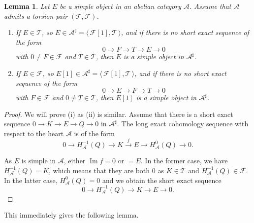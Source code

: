 \documentclass[12pt]{amsart}
\newtheorem{lemma}[theorem]{Lemma}
\theoremstyle{definition}
\DeclareMathOperator{\Img}{Im}
\begin{document}
\begin{lemma}\label{tiltsimple}
Let $E$ be a simple object in an abelian category $\mathcal{A}$.  
Assume that $\mathcal{A}$ admits a torsion pair $(\mathcal{T},\mathcal{F})$.
\begin{enumerate}
\item If $E \in \mathcal{T}$, so $E \in \mathcal{A}^\sharp = \langle \, \mathcal{F}[1], \mathcal{T} \,\rangle$,
and if there is no short exact sequence of the form $$ 0 \longrightarrow F \longrightarrow T \longrightarrow E \longrightarrow 0$$
with $0 \neq F \in \mathcal{F}$ and $T \in \mathcal{T}$,
then $E$ is a simple object in $\mathcal{A}^\sharp$.
\item If $E \in \mathcal{F}$, so $E[1] \in \mathcal{A}^\sharp = \langle \, \mathcal{F}[1], \mathcal{T} \,\rangle$,
and if there is no short exact sequence of the form $$ 0 \longrightarrow E \longrightarrow F \longrightarrow T \longrightarrow 0$$
with $F \in \mathcal{F}$ and $0 \neq T \in \mathcal{T}$,
then $E[1]$ is a simple object in $\mathcal{A}^\sharp$.
\end{enumerate}
\end{lemma}
\begin{proof}
We will prove (i) as (ii) is similar.
Assume that there is a short exact sequence $0 \longrightarrow K \longrightarrow E \longrightarrow Q \longrightarrow 0$ in $\mathcal{A}^\sharp$.
The long exact cohomology sequence with respect to the heart $\mathcal{A}$ is of the form 
$$ 0 \longrightarrow H^{-1}_{\mathcal{A}}(Q) \longrightarrow K \stackrel{f}\longrightarrow E \longrightarrow H^{0}_{\mathcal{A}}(Q) \longrightarrow 0.$$

As $E$ is simple in $\mathcal{A}$, either $\Img f = 0$ or $=E$.
In the former case, we have $H^{-1}_{\mathcal{A}}(Q) = K$,
which means that they are both $0$ as $K \in \mathcal{T}$ and $H^{-1}_{\mathcal{A}}(Q) \in \mathcal{F}$.
In the latter case, $H^0_{\mathcal{A}}(Q) = 0$ and we obtain the short exact sequence $$ 0 \longrightarrow H^{-1}_{\mathcal{A}}(Q) \longrightarrow K \longrightarrow E \longrightarrow 0.$$
\end{proof}

This immediately gives the following lemma.
\end{document}
